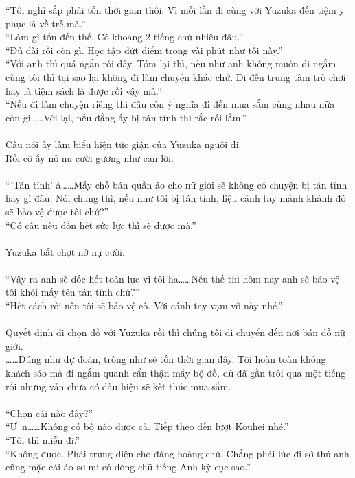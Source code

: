 \documentclass[12pt,a4paper, twosides]{book}
\begin{document}
“Tôi nghĩ sắp phải tốn thời gian thôi. Vì mỗi lần đi cùng với Yuzuka đến tiệm y phục là về trễ mà.”\\
“Làm gì tốn đến thế. Có khoảng 2 tiếng chứ nhiêu đâu.”\\
“Đủ dài rồi còn gì. Học tập dứt điểm trong vài phút như tôi này.”\\
“Với anh thì quá ngắn rồi đấy. Tóm lại thì, nếu như anh không muốn đi ngắm cùng tôi thì tại sao lại không đi làm chuyện khác chứ. Đi đến trung tâm trò chơi hay là tiệm sách là được rồi vậy mà.”\\
“Nếu đi làm chuyện riêng thì đâu còn ý nghĩa đi đến mua sắm cùng nhau nữa còn gì……Với lại, nếu đằng ấy bị tán tỉnh thì rắc rối lắm.”\\
\\
Câu nói ấy làm biểu hiện tức giận của Yuzuka nguôi đi.\\
Rồi cô ấy nở nụ cười gượng như cạn lời.\\
\\
“‘Tán tỉnh’ à……Mấy chỗ bán quần áo cho nữ giới sẽ không có chuyện bị tán tỉnh hay gì đâu. Nói chung thì, nếu như tôi bị tán tỉnh, liệu cánh tay mảnh khảnh đó sẽ bảo vệ được tôi chứ?”\\
“Có câu nếu dồn hết sức lực thì sẽ được mà.”\\
\\
Yuzuka bất chợt nở nụ cười.\\
\\
“Vậy ra anh sẽ dốc hết toàn lực vì tôi ha……Nếu thế thì hôm nay anh sẽ bảo vệ tôi khỏi mấy tên tán tỉnh chứ?”\\
“Hết cách rồi nên tôi sẽ bảo vệ cô. Với cánh tay vạm vỡ này nhé.”\\
\\
Quyết định đi chọn đồ với Yuzuka rồi thì chúng tôi di chuyển đến nơi bán đồ nữ giới.\\
……Đúng như dự đoán, trông như sẽ tốn thời gian đây. Tôi hoàn toàn không khách sáo mà đi ngắm quanh cẩn thận mấy bộ đồ, dù đã gần trôi qua một tiếng rồi nhưng vẫn chưa có dấu hiệu sẽ kết thúc mua sắm.\\
\\
“Chọn cái nào đây?”\\
“Ư~n……Không có bộ nào được cả. Tiếp theo đến lượt Kouhei nhé.”\\
“Tôi thì miễn đi.”\\
“Không được. Phải trưng diện cho đàng hoàng chứ. Chẳng phải lúc đi sở thú anh cũng mặc cái áo sơ mi có dòng chữ tiếng Anh kỳ cục sao.”\\
\end{document}
